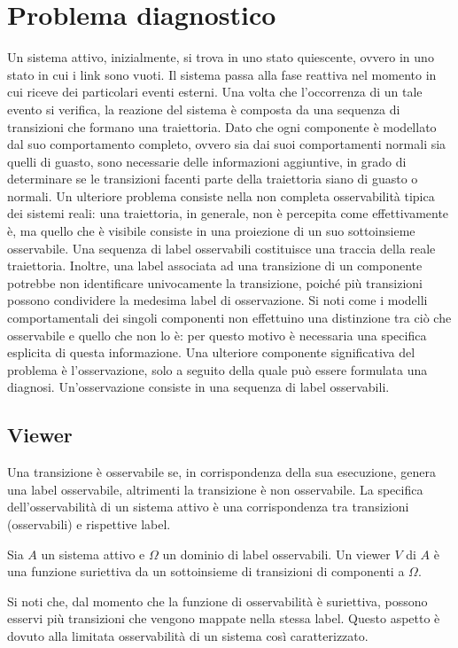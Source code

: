 \section{Problema diagnostico}
Un sistema attivo, inizialmente, si trova in uno stato quiescente, ovvero in uno stato in cui i link sono vuoti. Il sistema passa alla fase reattiva nel momento in cui riceve dei particolari eventi esterni. Una volta che l'occorrenza di un tale evento si verifica, la reazione del sistema è composta da una sequenza di transizioni che formano una traiettoria. Dato che ogni componente è modellato dal suo comportamento completo, ovvero sia dai suoi comportamenti normali sia quelli di guasto, sono necessarie delle informazioni aggiuntive, in grado di determinare se le transizioni facenti parte della traiettoria siano di guasto o normali. Un ulteriore problema consiste nella non completa osservabilità tipica dei sistemi reali: una traiettoria, in generale, non è percepita come effettivamente è, ma quello che è visibile consiste in una proiezione di un suo sottoinsieme osservabile. Una sequenza di label osservabili costituisce una traccia della reale traiettoria. Inoltre, una label associata ad una transizione di un componente potrebbe non identificare univocamente la transizione, poiché più transizioni possono condividere la medesima label di osservazione. Si noti come i modelli comportamentali dei singoli componenti non effettuino una distinzione tra ciò che osservabile e quello che non lo è: per questo motivo è necessaria una specifica esplicita di questa informazione. Una ulteriore componente significativa del problema è l'osservazione, solo a seguito della quale può essere formulata una diagnosi. Un'osservazione consiste in una sequenza di label osservabili.

\subsection{Viewer}
Una transizione è osservabile se, in corrispondenza della sua esecuzione, genera una label osservabile, altrimenti la transizione è non osservabile. La specifica dell'osservabilità di un sistema attivo è una corrispondenza tra transizioni (osservabili) e rispettive label.
\begin{defn}
Sia $A$ un sistema attivo e $\Omega$ un dominio di label osservabili. Un viewer $V$ di $A$ è una funzione suriettiva da un sottoinsieme di transizioni di componenti a $\Omega$.
\end{defn}
Si noti che, dal momento che la funzione di osservabilità è suriettiva, possono esservi più transizioni che vengono mappate nella stessa label. Questo aspetto è dovuto alla limitata osservabilità di un sistema così caratterizzato.

